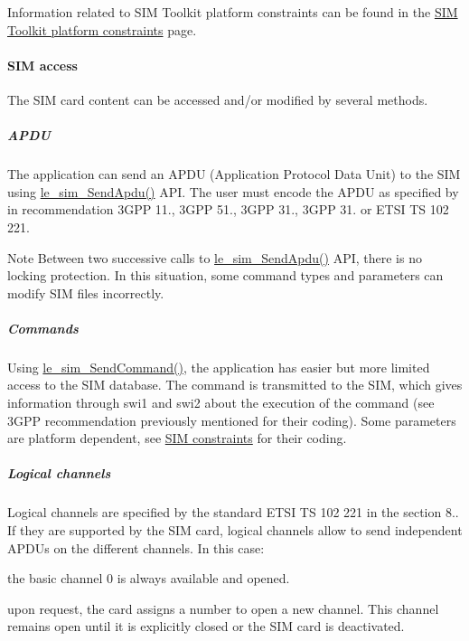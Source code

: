 Information related to S\+IM Toolkit platform constraints can be found in the \hyperlink{platformConstraintsStk}{S\+IM Toolkit platform constraints} page.\hypertarget{c_sim_le_sim_access}{}\paragraph{S\+I\+M access}\label{c_sim_le_sim_access}
The S\+IM card content can be accessed and/or modified by several methods.\hypertarget{c_sim_le_sim_accessApdu}{}\subparagraph{A\+P\+DU}\label{c_sim_le_sim_accessApdu}
The application can send an A\+P\+DU (Application Protocol Data Unit) to the S\+IM using \hyperlink{le__sim__interface_8h_ad59f8ec574f4eab0cfae070a1e593298}{le\+\_\+sim\+\_\+\+Send\+Apdu()} A\+PI. The user must encode the A\+P\+DU as specified by in recommendation 3\+G\+PP 11., 3\+G\+PP 51., 3\+G\+PP 31., 3\+G\+PP 31. or E\+T\+SI TS 102 221. \begin{DoxyNote}{Note}
Between two successive calls to \hyperlink{le__sim__interface_8h_ad59f8ec574f4eab0cfae070a1e593298}{le\+\_\+sim\+\_\+\+Send\+Apdu()} A\+PI, there is no locking protection. In this situation, some command types and parameters can modify S\+IM files incorrectly.
\end{DoxyNote}
\hypertarget{c_sim_le_sim_accessCommand}{}\subparagraph{Commands}\label{c_sim_le_sim_accessCommand}
Using \hyperlink{le__sim__interface_8h_a8bbaea044b44f8b0ebff67bf98de816a}{le\+\_\+sim\+\_\+\+Send\+Command()}, the application has easier but more limited access to the S\+IM database. The command is transmitted to the S\+IM, which gives information through swi1 and swi2 about the execution of the command (see 3\+G\+PP recommendation previously mentioned for their coding). Some parameters are platform dependent, see \hyperlink{platformConstraintsSim}{S\+IM constraints} for their coding.\hypertarget{c_sim_le_sim_accessLogicalChannel}{}\subparagraph{Logical channels}\label{c_sim_le_sim_accessLogicalChannel}
Logical channels are specified by the standard E\+T\+SI TS 102 221 in the section 8.. If they are supported by the S\+IM card, logical channels allow to send independent A\+P\+D\+Us on the different channels. In this case\+:
\begin{DoxyItemize}
\item the basic channel 0 is always available and opened.
\item upon request, the card assigns a number to open a new channel. This channel remains open until it is explicitly closed or the S\+IM card is deactivated.
\end{DoxyItemize}

